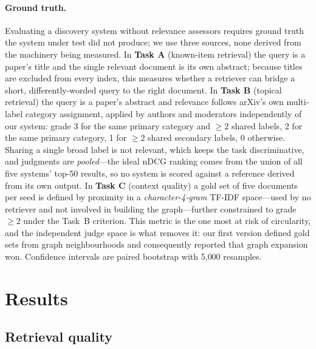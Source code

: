 \documentclass[runningheads]{llncs}
\begin{document}
\paragraph{Ground truth.}
Evaluating a discovery system without relevance assessors requires ground truth the
system under test did not produce; we use three sources, none derived from the machinery
being measured. In \textbf{Task A} (known-item retrieval) the query is a paper's title
and the single relevant document is its own abstract; because titles are excluded from
every index, this measures whether a retriever can bridge a short, differently-worded
query to the right document. In \textbf{Task B} (topical retrieval) the query is a
paper's abstract and relevance follows arXiv's own multi-label category assignment,
applied by authors and moderators independently of our system: grade 3 for the same
primary category and $\ge 2$ shared labels, 2 for the same primary category, 1 for
$\ge 2$ shared secondary labels, 0 otherwise. Sharing a single broad label is not
relevant, which keeps the task discriminative, and judgments are \emph{pooled}---the
ideal nDCG ranking comes from the union of all five systems' top-50 results, so no
system is scored against a reference derived from its own output. In \textbf{Task C}
(context quality) a gold set of five documents per seed is defined by proximity in a
\emph{character-4-gram} TF-IDF space---used by no retriever and not involved in building
the graph---further constrained to grade $\ge 2$ under the Task~B criterion. This metric
is the one most at risk of circularity, and the independent judge space is what removes
it: our first version defined gold sets from graph neighbourhoods and consequently
reported that graph expansion won. Confidence intervals are paired bootstrap with
5{,}000 resamples.

\section{Results}
\label{sec:results}

\subsection{Retrieval quality}
\label{sec:res:retrieval}
\end{document}
